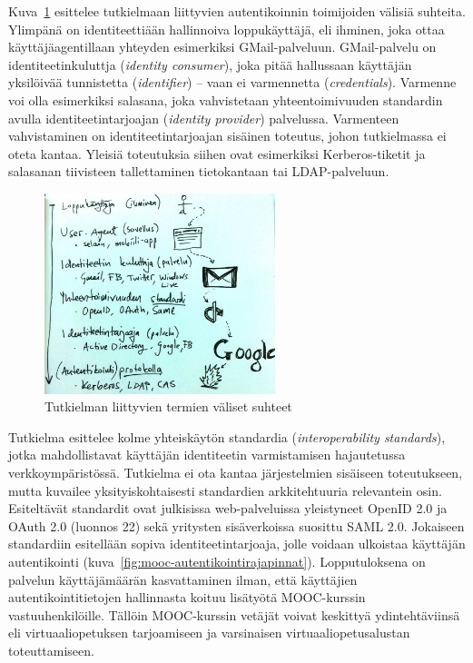 \documentclass[finnish,gradu]{tktltiki}
\begin{document}
  Kuva~\ref{fig:yleiskuva_termien_suhteista} esittelee tutkielmaan liittyvien autentikoinnin toimijoiden välisiä suhteita. Ylimpänä on identiteettiään hallinnoiva loppukäyttäjä, eli ihminen, joka ottaa käyttäjäagentillaan yhteyden esimerkiksi GMail-palveluun. GMail-palvelu on identiteetinkuluttja (\emph{identity consumer}), joka pitää hallussaan käyttäjän yksilöivää tunnistetta (\emph{identifier}) -- vaan ei varmennetta (\emph{credentials}). Varmenne voi olla esimerkiksi salasana, joka vahvistetaan yhteentoimivuuden standardin avulla identiteetintarjoajan (\emph{identity provider}) palvelussa. Varmenteen vahvistaminen on identiteetintarjoajan sisäinen toteutus, johon tutkielmassa ei oteta kantaa. Yleisiä toteutuksia siihen ovat esimerkiksi Kerberos-tiketit ja salasanan tiivisteen tallettaminen tietokantaan tai LDAP-palveluun.

  \begin{figure}[h!]
    \centering
    \includegraphics[width=0.6\textwidth]{images/auth_yleiskuva.jpg}
    \caption{Tutkielman liittyvien termien väliset suhteet}
    \label{fig:yleiskuva_termien_suhteista}
  \end{figure}


  Tutkielma esittelee kolme yhteiskäytön standardia (\emph{interoperability standards}), jotka mahdollistavat käyttäjän identiteetin varmistamisen hajautetussa verkkoympäristössä. Tutkielma ei ota kantaa järjestelmien sisäiseen toteutukseen, mutta kuvailee yksityiskohtaisesti standardien arkkitehtuuria relevantein osin. Esiteltävät standardit ovat julkisissa web-palveluissa yleistyneet OpenID 2.0 ja OAuth 2.0 (luonnos 22) sekä yritysten sisäverkoissa suosittu SAML 2.0. Jokaiseen standardiin esitellään sopiva identiteetintarjoaja, jolle voidaan ulkoistaa käyttäjän autentikointi (kuva~\ref{fig:mooc-autentikointirajapinnat}). Lopputuloksena on palvelun käyttäjämäärän kasvattaminen ilman, että käyttäjien autentikointitietojen hallinnasta koituu lisätyötä MOOC-kurssin vastuuhenkilöille. Tällöin MOOC-kurssin vetäjät voivat keskittyä ydintehtäviinsä eli virtuaaliopetuksen tarjoamiseen ja varsinaisen virtuaaliopetusalustan toteuttamiseen.
\end{document}
